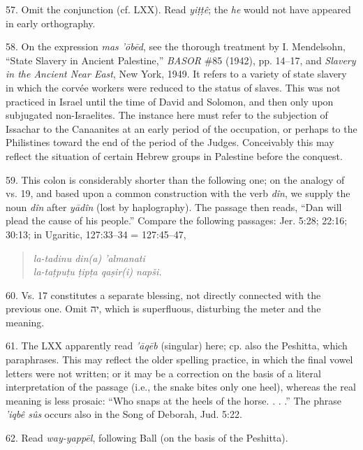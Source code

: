 \begin{enumerate}
57. Omit the conjunction (cf. LXX). Read \emph{yiṭṭê}; the \emph{he} would not
have appeared in early orthography.

58. On the expression \emph{mas 'ōbēd}, see the thorough treatment by
I. Mendelsohn, ``State Slavery in Ancient Palestine,'' \emph{BASOR} \#85
(1942), pp. 14--17, and \emph{Slavery in the Ancient Near East}, New York,
1949. It refers to a variety of state slavery in which the corvée workers were
reduced to the status of slaves. This was not practiced in Israel until the
time of David and Solomon, and then only upon subjugated non-Israelites. The
instance here must refer to the subjection of Issachar to the Canaanites at an
early period of the occupation, or perhaps to the Philistines toward the end of
the period of the Judges. Conceivably this may reflect the situation of certain
Hebrew groups in Palestine before the conquest.

59. This colon is considerably shorter than the following one; on the analogy
of vs. 19, and based upon a common construction with the verb \emph{dîn}, we
supply the noun \emph{dîn} after \emph{yādîn} (lost by haplography). The
passage then reads, ``Dan will plead the cause of his people.'' Compare the
following passages: Jer. 5:28; 22:16; 30:13; in Ugaritic, 127:33--34 =
127:45--47,

\begin{quote}
\emph{la-tadinu \qquad din(a) \qquad 'almanati}\\
\emph{la-taṭpuṭu \qquad ṭipṭa \qquad qaṣir(i) \qquad napši.}
\end{quote}

60. Vs. 17 constitutes a separate blessing, not directly connected with the
previous one. Omit יה, which is superfluous, disturbing the meter and the
meaning.

61. The LXX apparently read \emph{'āqēb} (singular) here; cp. also the
Peshitta, which paraphrases. This may reflect the older spelling practice, in
which the final vowel letters were not written; or it may be a correction on
the basis of a literal interpretation of the passage (i.e., the snake bites
only one heel), whereas the real meaning is less prosaic: ``Who snaps at the
heels of the horse. . . .'' The phrase \emph{'iqbê sûs} occurs also in the
Song of Deborah, Jud. 5:22.

62. Read \emph{way-yappēl}, following Ball (on the basis of the Peshitta).


\end{enumerate}
